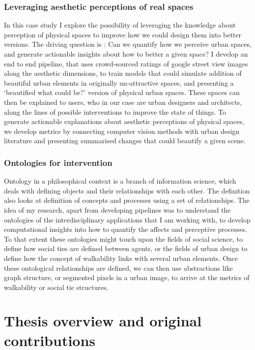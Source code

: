 \subsubsection{Leveraging aesthetic perceptions of real spaces}
In this case study I explore the possibility of leveraging the knowledge about perception of physical spaces to improve how we could design them into better versions. The driving question is : Can we quantify how we perceive urban spaces, and generate actionable insights about how to better a given space?  I develop an end to end pipeline, that uses crowd-sourced ratings of google street view images along the aesthetic dimensions, to train models that could simulate addition of beautiful urban elements in originally un-attractive spaces, and presenting a `beautified what could be?' version of physical urban spaces. These spaces can then be explained to users, who in our case are urban designers and architects, along the lines of possible interventions to improve the state of things. To generate actionable  explanations about aesthetic perceptions of physical spaces, we develop metrics by connecting computer vision methods with urban design literature and presenting summarised changes that could beautify a given scene. 

\subsubsection{Ontologies for intervention}
Ontology in a philosophical context is a branch of information science, which deals with defining objects and their relationships with each other. The definition also looks at definition of concepts and processes using a set of relationships. The idea of my research, apart from developing pipelines was to understand the ontologies of the interdisciplinary applications that I am working with, to develop computational insights into how to quantify the affects and perceptive processes. To that extent these ontologies might touch upon the fields of social science, to define how social ties are defined between agents, or the fields of urban design to define how the concept of walkability links with several urban elements. Once these ontological relationships are defined, we can then use abstractions like graph structure, or segmented pixels in a urban image, to arrive at the metrics of walkability or social tie structures.



\section{Thesis overview and original contributions}

